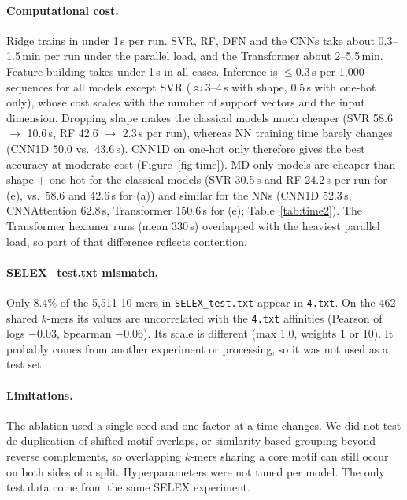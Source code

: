 \documentclass[11pt,a4paper]{article}
\begin{document}
\paragraph{Computational cost.} Ridge trains in under 1\,s per run. SVR, RF, DFN and the CNNs take about 0.3--1.5\,min per run under the parallel load, and the Transformer about 2--5.5\,min. Feature building takes under 1\,s in all cases. Inference is $\leq$0.3\,s per 1{,}000 sequences for all models except SVR ($\approx$3--4\,s with shape, 0.5\,s with one-hot only), whose cost scales with the number of support vectors and the input dimension. Dropping shape makes the classical models much cheaper (SVR 58.6 $\to$ 10.6\,s, RF 42.6 $\to$ 2.3\,s per run), whereas NN training time barely changes (CNN1D 50.0 vs.\ 43.6\,s). CNN1D on one-hot only therefore gives the best accuracy at moderate cost (Figure~\ref{fig:time}). MD-only models are cheaper than shape + one-hot for the classical models (SVR 30.5\,s and RF 24.2\,s per run for (e), vs.\ 58.6 and 42.6\,s for (a)) and similar for the NNs (CNN1D 52.3\,s, CNNAttention 62.8\,s, Transformer 150.6\,s for (e); Table~\ref{tab:time2}). The Transformer hexamer runs (mean 330\,s) overlapped with the heaviest parallel load, so part of that difference reflects contention.



\paragraph{SELEX\_test.txt mismatch.} Only 8.4\% of the 5{,}511 10-mers in \texttt{SELEX\_test.txt} appear in \texttt{4.txt}. On the 462 shared $k$-mers its values are uncorrelated with the \texttt{4.txt} affinities (Pearson of logs $-0.03$, Spearman $-0.06$). Its scale is different (max 1.0, weights 1 or 10). It probably comes from another experiment or processing, so it was not used as a test set.

\paragraph{Limitations.} The ablation used a single seed and one-factor-at-a-time changes. We did not test de-duplication of shifted motif overlaps, or similarity-based grouping beyond reverse complements, so overlapping $k$-mers sharing a core motif can still occur on both sides of a split. Hyperparameters were not tuned per model. The only test data come from the same SELEX experiment.
\end{document}
